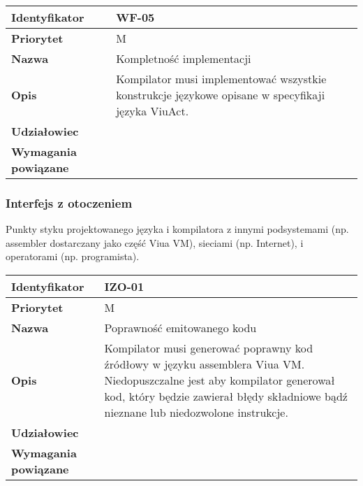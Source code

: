 \documentclass[11pt,oneside,a4paper,titlepage,onecolumn]{article}
\begin{document}
\vspace{1em}

\begin{tabular}{ | l | l | }
    \hline
    \textbf{Identyfikator} & \parbox[t]{11cm}{WF-05} \\
    \hline
    \textbf{Priorytet} & M \\
    \hline
    \textbf{Nazwa} & Kompletność implementacji \\
    \hline
    \textbf{Opis} & \parbox[t]{11cm}{
        Kompilator musi implementować wszystkie konstrukcje językowe opisane w specyfikaji języka
        ViuAct.
    } \\
    \hline
    \textbf{Udziałowiec} & \phantom{} \\
    \hline
    \textbf{Wymagania powiązane} & \phantom{} \\
    \hline
\end{tabular}

\subsubsection{Interfejs z otoczeniem}

Punkty styku projektowanego języka i kompilatora z innymi podsystemami (np. assembler dostarczany jako
część Viua VM), sieciami (np. Internet), i operatorami (np. programista).

\vspace{1em}

\begin{tabular}{ | l | l | }
    \hline
    \textbf{Identyfikator} & \parbox[t]{11cm}{IZO-01} \\
    \hline
    \textbf{Priorytet} & M \\
    \hline
    \textbf{Nazwa} & Poprawność emitowanego kodu \\
    \hline
    \textbf{Opis} & \parbox[t]{11cm}{
        Kompilator musi generować poprawny kod źródłowy w języku assemblera Viua VM.
        Niedopuszczalne jest aby kompilator generował kod, który będzie zawierał błędy składniowe bądź
        nieznane lub niedozwolone instrukcje.
    } \\
    \hline
    \textbf{Udziałowiec} & \phantom{} \\
    \hline
    \textbf{Wymagania powiązane} & \phantom{} \\
    \hline
\end{tabular}

\vspace{1em}
\end{document}
